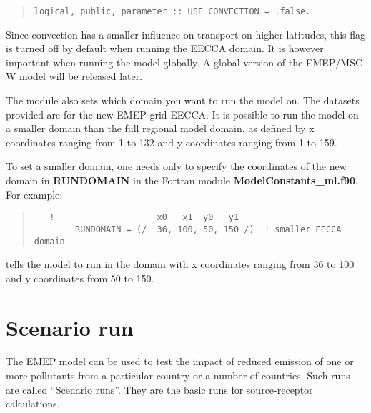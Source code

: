 \begin{small}
\begin{quote}
  \begin{verbatim}
logical, public, parameter :: USE_CONVECTION = .false. 
  \end{verbatim}
\end{quote}
\end{small}

Since convection has a smaller influence on transport on higher latitudes, this flag is turned off by 
default when running the EECCA domain. It is however important when running the model globally. A global version 
of the EMEP/MSC-W model will be released later. 



The module also sets which domain you want to run the model on. 
The datasets provided are for the new EMEP grid EECCA. 
It is possible to run the model on a smaller domain than the full
regional model domain, as defined by  x coordinates ranging
from 1 to 132 and y coordinates ranging from 1 to 159. 

To set a smaller domain, one needs only to specify the
coordinates of the new domain in {\bf RUNDOMAIN} in the Fortran module
 {\bf ModelConstants\_ml.f90}. For example:

\begin{quote}

\begin{verbatim}
   !                    x0   x1  y0   y1
        RUNDOMAIN = (/  36, 100, 50, 150 /)  ! smaller EECCA domain
\end{verbatim}
\end{quote}

tells the model to run in the domain with x coordinates ranging from
36 to 100 and y coordinates from 50 to 150.\\ 


\section{Scenario run}
\label{sec:scenrun}

The EMEP model can be used to test the impact of reduced emission of
one or more pollutants from a particular country or a number of
countries.  Such runs are called ``Scenario runs''. They are the basic
runs for source-receptor calculations.


